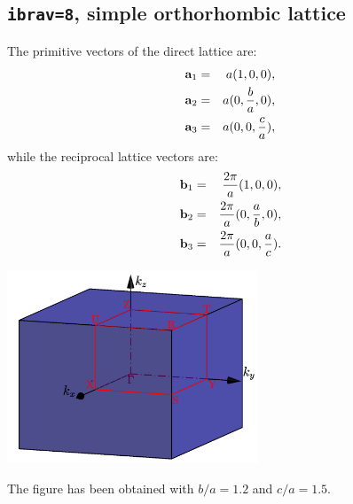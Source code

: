 \documentclass[12pt,a4paper]{article}
\begin{document}
\subsection{\texttt{ibrav=8}, simple orthorhombic lattice}
The primitive vectors of the direct lattice are:
\begin{eqnarray}
{\bf a}_1 &=& a (1, 0, 0), \nonumber \\
{\bf a}_2 &=& a (0, {b\over a}, 0), \nonumber \\
{\bf a}_3 &=& a (0, 0, {c\over a}), \nonumber
\nonumber
\end{eqnarray}
while the reciprocal lattice vectors are:
\begin{eqnarray}
{\bf b}_1 &=& {2\pi \over a} (1, 0, 0), \nonumber \\
{\bf b}_2 &=& {2\pi \over a} (0, {a\over b}, 0), \nonumber \\
{\bf b}_3 &=& {2\pi \over a} (0, 0, {a\over c}). \nonumber
\nonumber
\end{eqnarray}
\begin{center}
\includegraphics[width=7.5cm,angle=0]{images/so.png}
\end{center}
The figure has been obtained with $b/a=1.2$ and $c/a=1.5$.
\end{document}
